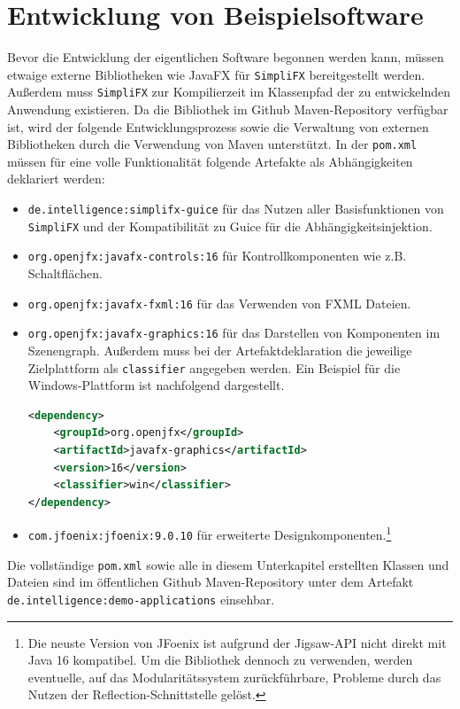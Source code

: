 \section{Entwicklung von Beispielsoftware}
\label{entwicklung_von_beispielsoftware}
\noindent Bevor die Entwicklung der eigentlichen Software begonnen werden kann, müssen etwaige externe Bibliotheken wie JavaFX für \texttt{SimpliFX} bereitgestellt werden. Außerdem muss \texttt{SimpliFX} zur Kompilierzeit im Klassenpfad der zu entwickelnden Anwendung existieren. Da die Bibliothek im Github Maven-Repository verfügbar ist, wird der folgende Entwicklungsprozess sowie die Verwaltung von externen Bibliotheken durch die Verwendung von Maven unterstützt. In der \texttt{pom.xml} müssen für eine volle Funktionalität folgende Artefakte als Abhängigkeiten deklariert werden:
\begin{itemize}
	\item \texttt{de.intelligence:simplifx-guice} für das Nutzen aller Basisfunktionen von \texttt{SimpliFX} und der Kompatibilität zu Guice für die Abhängigkeitsinjektion.
	\item \texttt{org.openjfx:javafx-controls:16} für Kontrollkomponenten wie z.B. Schaltflächen.
	\item \texttt{org.openjfx:javafx-fxml:16} für das Verwenden von FXML Dateien.
	\item \texttt{org.openjfx:javafx-graphics:16} für das Darstellen von Komponenten im Szenengraph. Außerdem muss bei der Artefaktdeklaration die jeweilige Zielplattform als \texttt{classifier} angegeben werden. Ein Beispiel für die Windows-Plattform ist nachfolgend dargestellt.
	\begin{lstlisting}[language=XML, frame=none, belowskip=0pt]
<dependency>
    <groupId>org.openjfx</groupId>
    <artifactId>javafx-graphics</artifactId>
    <version>16</version>
    <classifier>win</classifier>
</dependency>	
	\end{lstlisting}
	\item \texttt{com.jfoenix:jfoenix:9.0.10} für erweiterte Designkomponenten.\footnote{Die neuste Version von JFoenix ist aufgrund der Jigsaw-API nicht direkt mit Java 16 kompatibel. Um die Bibliothek dennoch zu verwenden, werden eventuelle, auf das Modularitätssystem zurückführbare, Probleme durch das Nutzen der Reflection-Schnittstelle gelöst.}
\end{itemize}
Die vollständige \texttt{pom.xml} sowie alle in diesem Unterkapitel erstellten Klassen und Dateien sind im öffentlichen Github Maven-Repository unter dem Artefakt \texttt{de.intelligence:demo-applications} einsehbar.
